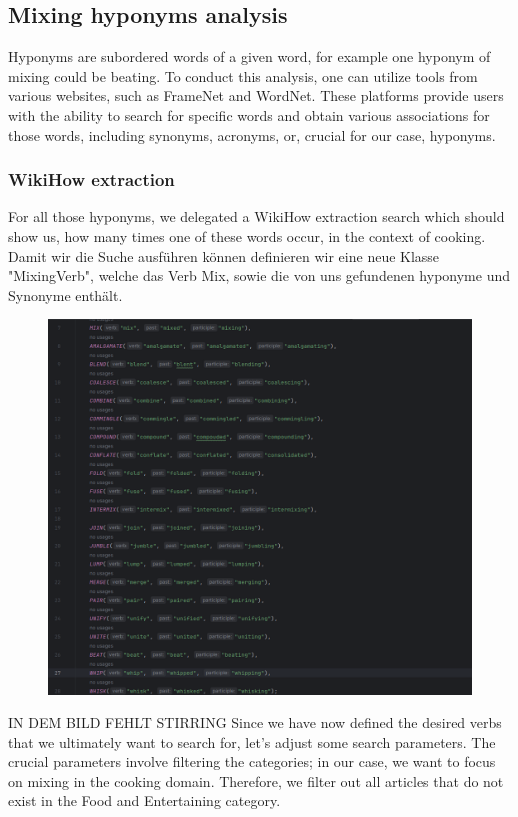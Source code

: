   \subsection*{Mixing hyponyms analysis} 
	Hyponyms are subordered words of a given word, for example one hyponym of mixing could be beating. 
  To conduct this analysis, one can utilize tools from various websites, such as FrameNet and WordNet. These platforms provide users with the ability to search for specific words and obtain various associations for those words, including synonyms, acronyms, or, crucial for our case, hyponyms.	
  \subsubsection*{WikiHow extraction}
  For all those hyponyms, we delegated a WikiHow extraction search which should show us, how many times one of these words occur, in the context of cooking.
	Damit wir die Suche ausführen können definieren wir eine neue Klasse "MixingVerb", welche das Verb Mix, sowie die von uns gefundenen hyponyme und Synonyme enthält.
  \begin{figure}[H]
    \includegraphics[scale=0.3]{Graphics/MixingVerbClass.png}
    \end{figure}
    IN DEM BILD FEHLT STIRRING
    Since we have now defined the desired verbs that we ultimately want to search for, let's adjust some search parameters. The crucial parameters involve filtering the categories; in our case, we want to focus on mixing in the cooking domain. Therefore, we filter out all articles that do not exist in the Food and Entertaining category.
